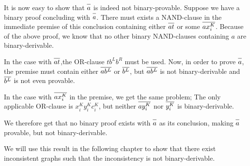 It is now easy to show that $\ol{a}$ is indeed not binary-provable.
Suppose we have a binary proof concluding with $\ol{a}$.
There must exists a NAND-clause in the immediate premise of this conclusion containing either $\ol{at}$ or some $\ol{ax^K_i}$.
Because of the above proof, we know that no other binary NAND-clauses containing $a$ are binary-derivable.

In the case with $\ol{at}$,the OR-clause $tb^Lb^R$ must be used.
Now, in order to prove $\ol{a}$, the premise must contain either $\ol{a b^L}$ or $\ol{b^L}$, but $\ol{a b^L}$ is not binary-derivable and $\ol{b^L}$ is not even provable.

In the case with $\ol{ax^K_i}$ in the premise, we get the same problem;
The only applicable OR-clause is $x^K_iy^K_ic^K_i$, but neither $\ol{a y^K_i}$ nor $\ol{y^K_i}$ is binary-derivable.

We therefore get that no binary proof exists with $\ol{a}$ as its conclusion, making $\ol{a}$ provable, but not binary-derivable.

We will use this result in the following chapter to show that there exist inconsistent graphs such that the inconsistency is not binary-derivable.
